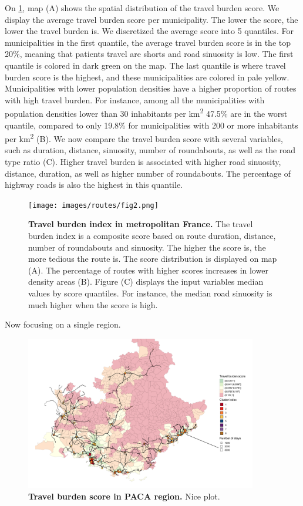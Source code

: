 On \cref{fig:routes-burden-index}, map (A) shows the spatial
distribution of the travel burden score. We display the average travel burden
score per municipality. The lower the score, the lower the travel burden is. We
discretized the average score into 5 quantiles. For municipalities in the first
quantile, the average travel burden score is in the top 20\%, meaning that
patients travel are shorts and road sinuosity is low. The first quantile is
colored in dark green on the map. The last quantile is where travel burden score
is the highest, and these municipalities are colored in pale yellow.
Municipalities with lower population densities have a higher proportion of
routes with high travel burden. For instance, among all the municipalities with
population densities lower than 30 inhabitants per km\textsuperscript{2} 47.5\%
are in the worst quantile, compared to only 19.8\% for municipalities with 200
or more inhabitants per km\textsuperscript{2} (B). We now compare the travel
burden score with several variables, such as duration, distance, sinuosity,
number of roundabouts, as well as the road type ratio (C). Higher travel burden
is associated with higher road sinuosity, distance, duration, as well as higher
number of roundabouts. The percentage of highway roads is also the highest in
this quantile.

\begin{figure}[h]
    \texttt{[image: images/routes/fig2.png]}
    \centering
    \caption{
        \textbf{Travel burden index in metropolitan France.}
        The travel burden index is a composite score based on route duration,
        distance, number of roundabouts and sinuosity. The higher the score is,
        the more tedious the route is. The score distribution is displayed on
        map (A). The percentage of routes with higher scores increases in lower
        density areas (B). Figure (C) displays the input variables median values
        by score quantiles. For instance, the median road sinuosity is much
        higher when the score is high. }
    \label{fig:routes-burden-index}
\end{figure}

Now focusing on a single region.

\begin{figure}[h]
    \includegraphics[width=0.9\textwidth]{images/routes/fig_7.png}
    \centering
    \caption{ \textbf{Travel burden score in PACA region.} Nice plot. }
    \label{fig:travel-duration-cancer-type}
\end{figure}

